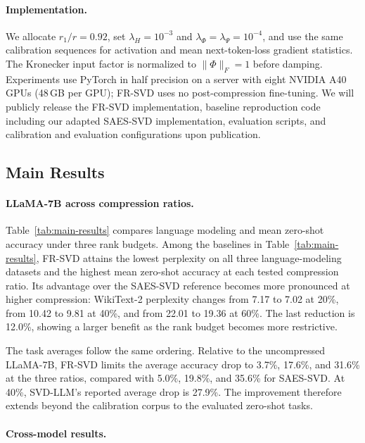 \documentclass[11pt]{article}
\begin{document}
\paragraph{Implementation.}
We allocate $r_1/r=0.92$, set $\lambda_H=10^{-3}$ and $\lambda_\Phi=\lambda_\Psi=10^{-4}$, and use the same calibration sequences for activation and mean next-token-loss gradient statistics. The Kronecker input factor is normalized to $\|\Phi\|_F=1$ before damping. Experiments use PyTorch in half precision on a server with eight NVIDIA A40 GPUs (48\,GB per GPU); FR-SVD uses no post-compression fine-tuning. We will publicly release the FR-SVD implementation, baseline reproduction code including our adapted SAES-SVD implementation, evaluation scripts, and calibration and evaluation configurations upon publication.


\subsection{Main Results}\label{sec:main-results-llama7b}



\paragraph{LLaMA-7B across compression ratios.}

Table~\ref{tab:main-results} compares language modeling and mean zero-shot accuracy under three rank budgets. Among the baselines in Table~\ref{tab:main-results}, FR-SVD attains the lowest perplexity on all three language-modeling datasets and the highest mean zero-shot accuracy at each tested compression ratio. Its advantage over the SAES-SVD reference becomes more pronounced at higher compression: WikiText-2 perplexity changes from 7.17 to 7.02 at 20\%, from 10.42 to 9.81 at 40\%, and from 22.01 to 19.36 at 60\%. The last reduction is 12.0\%, showing a larger benefit as the rank budget becomes more restrictive.

The task averages follow the same ordering. Relative to the uncompressed LLaMA-7B, FR-SVD limits the average accuracy drop to 3.7\%, 17.6\%, and 31.6\% at the three ratios, compared with 5.0\%, 19.8\%, and 35.6\% for SAES-SVD. At 40\%, SVD-LLM's reported average drop is 27.9\%. The improvement therefore extends beyond the calibration corpus to the evaluated zero-shot tasks.

\paragraph{Cross-model results.}
\end{document}
